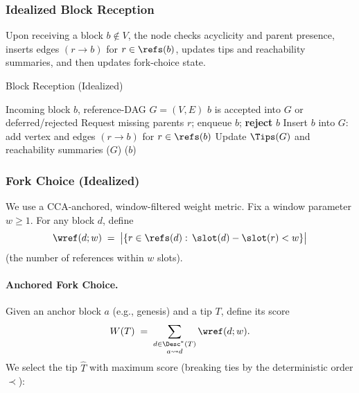 \subsubsection{Idealized Block Reception}
Upon receiving a block $b\notin V$, the node checks acyclicity and parent presence, inserts edges $(r\to b)$ for $r\in \refs(b)$,
updates tips and reachability summaries, and then updates fork-choice state.



\begin{algorithm}[htbp!]
\caption{Block Reception (Idealized)}
\label{alg:ideal-reception}
\begin{algorithmic}[1]
\Require Incoming block $b$, reference-DAG $G=(V,E)$
\Ensure $b$ is accepted into $G$ or deferred/rejected
 \Return \EndIf
{}
  \State Request missing parents $r$; enqueue $b$; \Return
\EndIf
{} \textbf{reject} $b$ \EndIf
\State Insert $b$ into $G$: add vertex and edges $(r\to b)$ for $r\in\refs(b)$
\State Update $\Tips(G)$ and reachability summaries
\State \ForkChoiceUpdate($G$) 
\State \Broadcast($b$)
\end{algorithmic}
\end{algorithm}






\subsubsection{Fork Choice (Idealized)}
\label{subsec:alg4}

We use a CCA-anchored, window-filtered weight metric. Fix a window parameter $w\ge1$. For any block $d$, define
\begin{equation*}
\wref(d;w) \;=\; \bigl|\{r\in \refs(d):\,\slot(d)-\slot(r) < w\}\bigr|
\end{equation*}
(the number of references within $w$ slots). 

\paragraph{Anchored Fork Choice.} Given an anchor block $a$ (e.g., genesis) and a tip $T$, define its score
\begin{equation*}
W(T)\;=\;\sum_{\substack{d\in\Desc^*(T)\\a\leadsto d}} \wref(d;w).
\end{equation*}
We select the tip $\hat{T}$ with maximum score (breaking ties by the deterministic order $\prec$):

